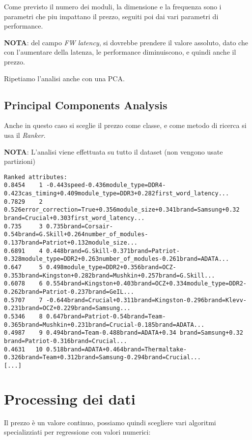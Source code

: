 \documentclass[12pt]{report}
\begin{document}
Come previsto il numero dei moduli, la dimensione e la frequenza sono i parametri che piu impattano
il prezzo, seguiti poi dai vari parametri di performance.

\textbf{NOTA}: del campo \textit{FW latency}, si dovrebbe prendere il valore assoluto, dato che con
l'aumentare della latenza, le performance diminuiscono, e quindi anche il prezzo.

Ripetiamo l'analisi anche con una PCA.

\newpage
\subsection{Principal Components Analysis}
Anche in questo caso si sceglie il prezzo come classe, e come metodo di ricerca si usa il \textit{Ranker}.

\textbf{NOTA}: L'analisi viene effettuata su tutto il dataset (non vengono usate partizioni)

\begin{lstlisting}
Ranked attributes:
0.8454    1 -0.443speed-0.436module_type=DDR4-0.423cas_timing+0.409module_type=DDR3+0.282first_word_latency...
0.7829    2 0.526error_correction=True+0.356module_size+0.341brand=Samsung+0.32 brand=Crucial+0.303first_word_latency...
0.735     3 0.735brand=Corsair-0.54brand=G.Skill+0.264number_of_modules-0.137brand=Patriot+0.132module_size...
0.6891    4 0.448brand=G.Skill-0.371brand=Patriot-0.328module_type=DDR2+0.263number_of_modules-0.261brand=ADATA...
0.647     5 0.498module_type=DDR2+0.356brand=OCZ-0.353brand=Kingston+0.282brand=Mushkin+0.257brand=G.Skill...
0.6078    6 0.554brand=Kingston+0.403brand=OCZ+0.334module_type=DDR2-0.262brand=Patriot-0.237brand=GeIL...
0.5707    7 -0.644brand=Crucial+0.311brand=Kingston-0.296brand=Klevv-0.231brand=OCZ+0.229brand=Samsung...
0.5346    8 0.647brand=Patriot-0.54brand=Team-0.365brand=Mushkin+0.231brand=Crucial-0.185brand=ADATA...
0.4987    9 0.494brand=Team-0.488brand=ADATA+0.34 brand=Samsung+0.32 brand=Patriot-0.316brand=Crucial...
0.4631   10 0.518brand=ADATA+0.464brand=Thermaltake-0.326brand=Team+0.312brand=Samsung-0.294brand=Crucial...
[...]
\end{lstlisting}


\newpage
\section{Processing dei dati}
Il prezzo è un valore continuo, possiamo quindi scegliere vari algoritmi specializziati per regressione con valori numerici:
\end{document}
